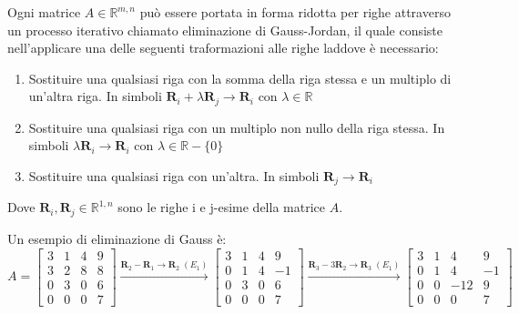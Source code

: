     \vspace{10pt}
    Ogni matrice $A \in \mathbb{R}^{m, n}$ può essere portata in forma ridotta per righe attraverso un processo iterativo chiamato
    eliminazione di Gauss-Jordan, il quale consiste nell'applicare una delle seguenti traformazioni alle righe laddove è necessario:
    \begin{enumerate}[label=(E\textsubscript{\arabic*}), leftmargin=1cm]
        \item Sostituire una qualsiasi riga con la somma della riga stessa e un multiplo di un'altra riga. In simboli $\mathbf{R}_{i} + \lambda \mathbf{R}_{j} \rightarrow \mathbf{R}_{i}$ con $\lambda \in \mathbb{R}$
        \item Sostituire una qualsiasi riga con un multiplo non nullo della riga stessa. In simboli $\lambda \mathbf{R}_{i} \rightarrow \mathbf{R}_{i}$ con $\lambda \in \mathbb{R} - \{0\}$
        \item Sostituire una qualsiasi riga con un'altra. In simboli $\mathbf{R}_{j} \rightarrow \mathbf{R}_{i}$
    \end{enumerate}
    Dove $\mathbf{R}_{i}, \mathbf{R}_{j} \in \mathbb{R}^{1, n}$ sono le righe i e j-esime della matrice $A$.

    \vspace{10pt}
    Un esempio di eliminazione di Gauss è:
    \[
        A =
        \begin{bmatrix}
            3 & 1 & 4 & 9 \\
            3 & 2 & 8 & 8 \\
            0 & 3 & 0 & 6 \\
            0 & 0 & 0 & 7
        \end{bmatrix}
        \xrightarrow{\mathbf{R}_{2} - \mathbf{R}_{1} \rightarrow \mathbf{R}_{2} \; (E_1)}
        \begin{bmatrix}
            3 & 1 & 4 & 9 \\
            0 & 1 & 4 & -1 \\
            0 & 3 & 0 & 6 \\
            0 & 0 & 0 & 7
        \end{bmatrix}
        \xrightarrow{\mathbf{R}_{3} - 3 \mathbf{R}_{2} \rightarrow \mathbf{R}_{3} \; (E_1)}
        \begin{bmatrix}
            3 & 1 & 4 & 9 \\
            0 & 1 & 4 & -1 \\
            0 & 0 & -12 & 9 \\
            0 & 0 & 0 & 7
        \end{bmatrix}
    \]

